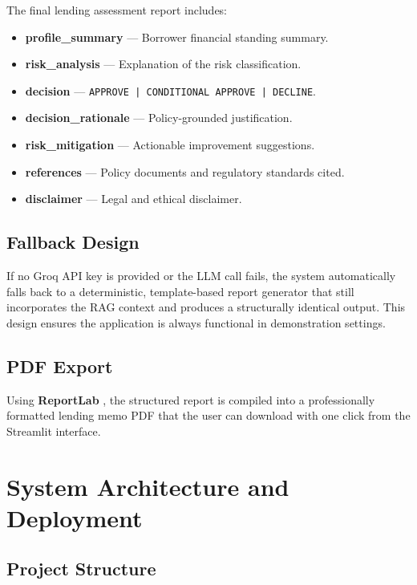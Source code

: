 \documentclass[11pt,a4paper]{article}
\begin{document}
The final lending assessment report includes:
\begin{itemize}[noitemsep]
    \item \textbf{profile\_summary} — Borrower financial standing summary.
    \item \textbf{risk\_analysis} — Explanation of the risk classification.
    \item \textbf{decision} — \texttt{APPROVE | CONDITIONAL APPROVE | DECLINE}.
    \item \textbf{decision\_rationale} — Policy-grounded justification.
    \item \textbf{risk\_mitigation} — Actionable improvement suggestions.
    \item \textbf{references} — Policy documents and regulatory standards cited.
    \item \textbf{disclaimer} — Legal and ethical disclaimer.
\end{itemize}

\subsection{Fallback Design}

If no Groq API key is provided or the LLM call fails, the system automatically falls back
to a deterministic, template-based report generator that still incorporates the RAG
context and produces a structurally identical output. This design ensures the application
is always functional in demonstration settings.

\subsection{PDF Export}

Using \textbf{ReportLab} \cite{reportlab}, the structured report is compiled into a
professionally formatted lending memo PDF that the user can download with one click
from the Streamlit interface.

\section{System Architecture and Deployment}
\label{sec:deploy}

\subsection{Project Structure}
\end{document}
